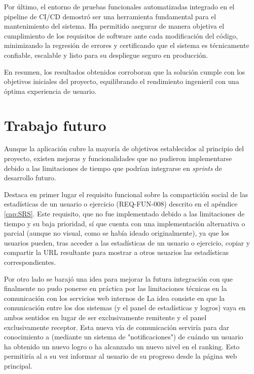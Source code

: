 Por último, el entorno de pruebas funcionales automatizadas integrado en el pipeline de CI/CD demostró ser una herramienta fundamental para el mantenimiento del sistema. Ha permitido asegurar de manera objetiva el cumplimiento de los requisitos de software ante cada modificación del código, minimizando la regresión de errores y certificando que el sistema es técnicamente confiable, escalable y listo para su despliegue seguro en producción. 

En resumen, los resultados obtenidos corroboran que la solución cumple con los objetivos iniciales del proyecto, equilibrando el rendimiento ingenieril con una óptima experiencia de usuario.

\section{Trabajo futuro}

Aunque la aplicación cubre la mayoría de objetivos establecidos al principio del proyecto, existen mejoras y funcionalidades que no pudieron implementarse debido a las limitaciones de tiempo que podrían integrarse en \textit{sprints} de desarrollo futuro. 

Destaca en primer lugar el requisito funcional sobre la compartición social de las estadísticas de un usuario o ejercicio (REQ-FUN-008) descrito en el apéndice \ref{cap:SRS}. Este requisito, que no fue implementado debido a las limitaciones de tiempo y su baja prioridad, sí que cuenta con una implementación alternativa o parcial (aunque no visual, como se había ideado originalmente), ya que los usuarios pueden, tras acceder a las estadísticas de un usuario o ejercicio, copiar y compartir la URL resultante para mostrar a otros usuarios las estadísticas correspondientes. 

Por otro lado se barajó una idea para mejorar la futura integración con \aer que finalmente no pudo ponerse en práctica por las limitaciones técnicas en la comunicación con los servicios web internos de \aer La idea consiste en que la comunicación entre los dos sistemas (\aer y el panel de estadísticas y logros) vaya en ambos sentidos en lugar de ser \aer exclusivamente remitente y el panel exclusivamente receptor. Esta nueva vía de comunicación serviría para dar conocimiento a \aer (mediante un sistema de "notificaciones") de cuándo un usuario ha obtenido un nuevo logro o ha alcanzado un nuevo nivel en el ranking. Esto permitiría al \aer a su vez informar al usuario de su progreso desde la página web principal.

